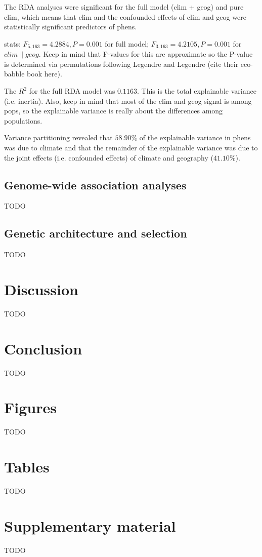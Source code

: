 \documentclass[fleqn,11pt]{wlpeerj}
\begin{document}
The RDA analyses were significant for the full model (clim + geog) and pure clim,
which means that clim and the confounded effects of clim and geog were statistically
significant predictors of phens.

stats: $F_{5,163} = 4.2884, P = 0.001$ for full model; $F_{3,163} = 4.2105, P = 0.001$ for $clim\|geog$.
Keep in mind that F-values for this are approximate so the P-value is determined via permutations
following Legendre and Legendre (cite their eco-babble book here).

The $R^{2}$ for the full RDA model was $0.1163$. This is the total explainable variance (i.e. inertia).
Also, keep in mind that most of the clim and geog signal is among pops, so the
explainable variance is really about the differences among populations.

Variance partitioning revealed that $58.90\%$ of the explainable variance in phens
was due to climate and that the remainder of the explainable variance was due to
the joint effects (i.e. confounded effects) of climate and geography ($41.10\%$). 

\subsection*{Genome-wide association analyses}
TODO

\subsection*{Genetic architecture and selection}
TODO

\section*{Discussion}
TODO


\section*{Conclusion}
TODO


\section*{Figures}
TODO

\section*{Tables}
TODO

\section*{Supplementary material}
TODO

\clearpage

\end{document}
